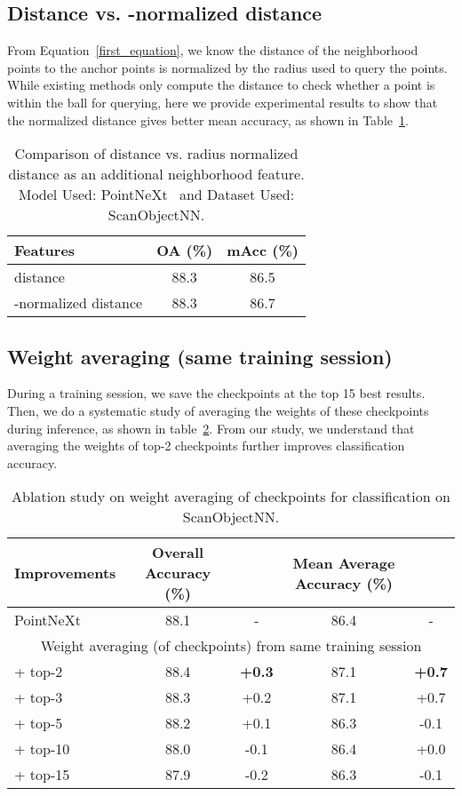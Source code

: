 \documentclass[runningheads]{llncs}
\begin{document}
\subsection{Distance vs. -normalized distance}
From Equation~\ref{first_equation}, we know the distance of the neighborhood points to the anchor points is normalized by the radius  used to query the points. While existing methods only compute the distance to check whether a point is within the ball for querying, here we provide experimental results to show that the normalized distance gives better mean accuracy, as shown in Table~\ref{tab4}.
\vspace{-1em}
\begin{table}[!h]
\centering
\caption{Comparison of distance vs. radius normalized distance as an additional neighborhood feature. Model Used: PointNeXt~\cite{PointNeXt} and Dataset Used: ScanObjectNN.}\label{tab4}
\begin{tabular}{|l|c|c|}
\hline
Features &  OA (\%) & mAcc (\%) \\
\hline
distance & 88.3 & 86.5\\
-normalized distance & 88.3 & 86.7\\
\hline
\end{tabular}
\end{table}
\vspace{-1em}
\subsection{Weight averaging (same training session)}
During a training session, we save the checkpoints at the top 15 best results. Then, we do a systematic study of averaging the weights of these checkpoints during inference, as shown in table~\ref{tab5}. From our study, we understand that averaging the weights of top-2 checkpoints further improves classification accuracy.
\vspace{-1em}
\begin{table}[!h]
\centering
\caption{ Ablation study on weight averaging of checkpoints for classification on ScanObjectNN.}\label{tab5}
\begin{tabular}{|l|c|c|c|c|}
\hline
Improvements &  Overall Accuracy (\%)&  & Mean Average Accuracy (\%)&\\
\hline
PointNeXt & 88.1 & - &86.4& - \\
\hline
\multicolumn{5}{c}{Weight averaging (of checkpoints) from same training session}\\
\hline
+ top-2 & 88.4&\textbf{+0.3}&87.1&\textbf{+0.7} \\
+ top-3 & 88.3&+0.2&87.1&+0.7\\
+ top-5& 88.2&+0.1&86.3&-0.1\\ 
+ top-10& 88.0&-0.1&86.4&+0.0\\ 
+ top-15& 87.9&-0.2&86.3&-0.1\\ 
\hline
\end{tabular}
\end{table}
\vspace{-1em}
\end{document}
